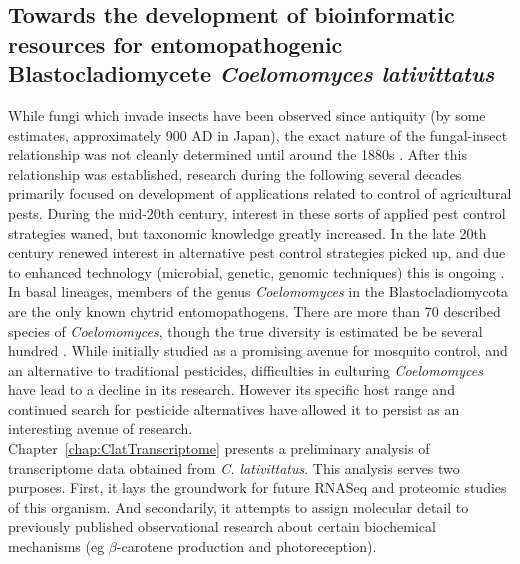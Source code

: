 \subsection*{Towards the development of bioinformatic resources for entomopathogenic Blastocladiomycete \textit{Coelomomyces lativittatus}}
While fungi which invade insects have been observed since antiquity 
(by some estimates, approximately 900 AD in Japan), the exact nature 
of the fungal-insect relationship was not cleanly determined until 
around the 1880s \cite{Samson1988}. After this relationship was established, 
research during the following several decades primarily focused on 
development of applications related to control of agricultural pests. During 
the mid-20th century, interest in these sorts of applied pest control strategies 
waned, but taxonomic knowledge greatly increased. In the late 20th century renewed 
interest in alternative pest control strategies picked up, and due to enhanced 
technology (microbial, genetic, genomic techniques) this is ongoing \cite{Samson1988}.\\
\indent In basal lineages, members of the genus \textit{Coelomomyces} in the
Blastocladiomycota are the only known chytrid entomopathogens. There are
more than 70 described species of \textit{Coelomomyces}, though the true
diversity is estimated be be several hundred \cite{Couch1985}. While
initially studied as a promising avenue for mosquito control, and an
alternative to traditional pesticides, difficulties in culturing
\textit{Coelomomyces} have lead to a decline in its research. However its
specific host range and continued search for pesticide alternatives
have allowed it to persist as an interesting avenue of research.\\
\indent Chapter~\ref{chap:ClatTranscriptome} presents a preliminary analysis of transcriptome data obtained from \textit{C. lativittatus}. This analysis serves two purposes. First, it lays the groundwork for future RNASeq and proteomic studies of this organism. And secondarily, it attempts to assign molecular detail to previously published observational research about certain biochemical mechanisms (eg $\beta$-carotene production and photoreception).\\


